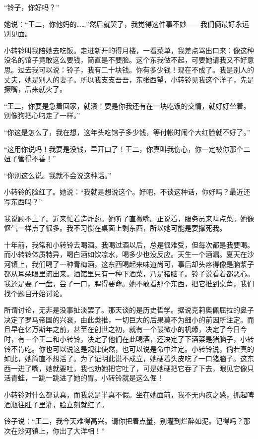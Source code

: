  “铃子，你好吗？” 
 
 她说：“王二，你他妈的……”然后就哭了，我觉得这件事不妙——我们俩最好永远别见面。 
 
 小转铃叫我陪她去吃饭。走进新开的得月楼，一看菜单，我差点骂出口来：像这种没名的馆子竟敢这么要钱，简直是不要脸。这个东我做不起，可要她请我又不好意思。过去我可以说：铃子，我有二十块钱。你有多少钱！现在不成了。我是别人的丈夫，她是别人的妻子。所以我支支吾吾，东张西望，小转铃见我这个洋子，先是撅嘴，后来就火了。 
 
 “王二，你要是急着回家，就滚！要是你我还有在一块吃饭的交情，就好好坐着。别像狗把心叼走了一样。” 
 
 “你这是怎么了，我在想，这年头吃馆子多少钱，等付帐时闹个大红脸就不好了。” 
 
 “这用你说吗！我要是没钱，早开口了！王二，你真叫我伤心，你一定被你那个二妞子管得不善！” 
 
 “你别这么说。我就不会说这种话。” 
 
 小转铃的脸红了。她说：“我就是想说这个。好吧，不谈这种话，你好吗？最近还写东西吗？” 
 
 我说顾不上了。近来忙着造炸药。她听了直撇嘴。正说着，服务员来叫点菜。她像怄气一样点了很多。我不习惯在桌面上剩东西，所以她可能是要撑死我。 
 
 十年前，我常和小转铃去喝酒。我喝过酒以后，总是很难受，但每次都是我要喝。而小转铃体质特异，喝白酒如饮凉水，喝多少也没反应。天生一个酒漏。夏天在沙河镇上，我们喝了一种青梅酒，这东西喝起来味道尚可，事后却头疼得像是脑浆子都从耳朵眼里流出来。酒馆里只有一种下酒菜，乃是猪脑子。铃子说看着都恶心。我还是要了一盘，尝了一口，腥得要命。她不敢看那个东西，把它推到桌角，我们找个题目开始讨论。 
 
 所谓讨论，无非是没事扯淡罢了。那天谈的是历史哲学。据说克莉奥佩屈拉的鼻子决定了罗马帝国的兴衰，由此类推，一切巨大的后果莫不为细小的前因所注定。而且早在亿万斯年之前，甚至在创世之初，就有一个最微小的机缘，决定了今日今时，有一个王二和小转铃，决定了他们在此喝酒，还决定了下酒菜是猪脑子，小转铃不肯吃。你也可以说这是规律使然，也可以说是命中注定。小转铃说，倘若真的如此，她简直不想活了。为了证明此说不成立，她硬着头皮吃了一口猪脑子。这东西一进了嘴，她就要吐，我也劝她把它吐了，可是她硬把它吞了下去，眼见它像只活青蛙，一跳一跳进了她的胃。小转铃就是这么倔！ 
 
 小转铃对什么都认真，而我总是半真不假。坐在她面前，我不无内疚之感，抓起啤酒瓶往肚子里灌，脸立刻就红了。 
 
 铃子说：“王二，我今天难得高兴。请你把着点量，别灌到烂醉如泥。记得吗？那次在沙河镇上，你出了大洋相！” 
 
